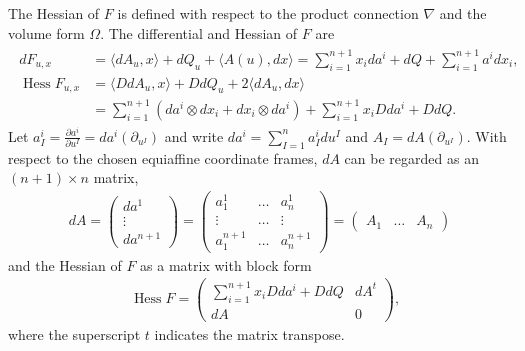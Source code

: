 \documentclass [leqno, 10pt]{amsart}
\theoremstyle{definition}
\numberwithin{equation}{section}
\newcommand{\Om}{\Omega}
\newcommand{\hess}{\operatorname{Hess}}
\newcommand{\pr}{\partial}
\newcommand{\lb}{\langle}
\newcommand{\ra}{\rangle}
\newcommand{\tensor}{\otimes}
\begin{document}
The Hessian of $F$ is defined with respect to the product connection $\nabla$ and the volume form $\Om$. The differential and Hessian of $F$ are
\begin{align}\label{dhessf}
\begin{split}
dF_{u, x} &= \lb dA_{u}, x \ra + dQ_{u} + \lb A(u), dx\ra = \sum_{i = 1}^{n+1}x_{i}da^{i} + dQ + \sum_{i = 1}^{n+1}a^{i}dx_{i},\\
\hess F_{u, x} &= \lb DdA_{u}, x \ra + DdQ_{u} + 2\lb dA_{u}, dx\ra \\
&= \sum_{i = 1}^{n+1}(da^{i} \tensor dx_{i} + dx_{i} \tensor da^{i})  + \sum_{i = 1}^{n+1}x_{i}Dda^{i} + DdQ.
\end{split}
\end{align}
Let $a^{i}_{I} = \frac{\pr a^{i}}{\pr u^{I}} = da^{i}(\pr_{u^{I}})$ and write $da^{i} = \sum_{I = 1}^{n}a^{i}_{I}du^{I}$ and $A_{I} = dA(\pr_{u^{I}})$. With respect to the chosen equiaffine coordinate frames, $dA$ can be regarded as an $(n+1)\times n$ matrix,
\begin{align}\label{da}
dA = \begin{pmatrix} da^{1} \\ \vdots \\ da^{n+1}\end{pmatrix} = \begin{pmatrix} a^{1}_{1} & \dots & a^{1}_{n}\\ \vdots & \dots & \vdots \\ a^{n+1}_{1} & \dots & a^{n+1}_{n}\end{pmatrix} = \begin{pmatrix} A_{1} & \dots & A_{n}\end{pmatrix}
\end{align}
and the Hessian of $F$ as a matrix with block form
\begin{align}\label{hessfmat}
&\hess F = \begin{pmatrix} \sum_{i = 1}^{n+1}x_{i}Dda^{i} + DdQ & dA^{t} \\ dA & 0 \end{pmatrix},
\end{align}
where the superscript $t$ indicates the matrix transpose.
\end{document}
